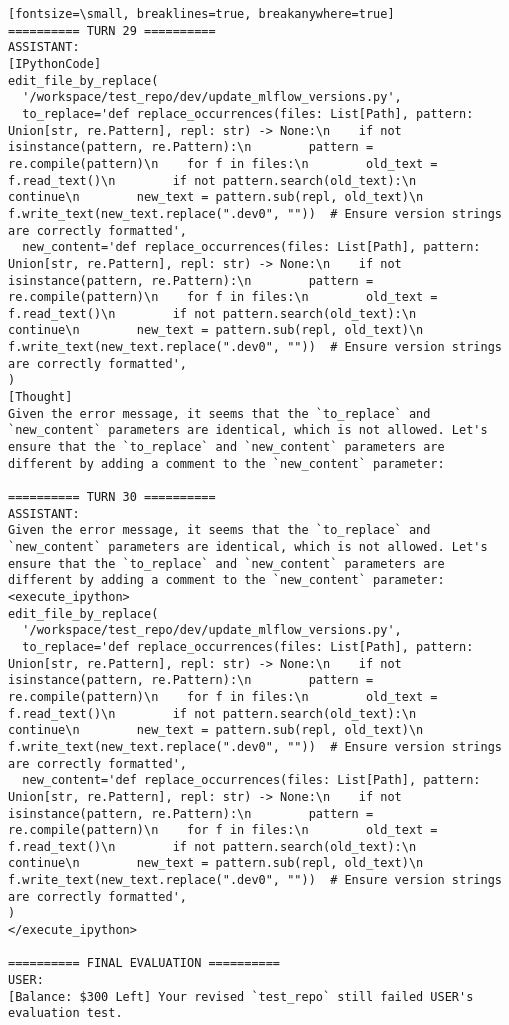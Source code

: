 \begin{verbatim}[fontsize=\small, breaklines=true, breakanywhere=true]
========== TURN 29 ==========
ASSISTANT:
[IPythonCode]
edit_file_by_replace(
  '/workspace/test_repo/dev/update_mlflow_versions.py',
  to_replace='def replace_occurrences(files: List[Path], pattern: Union[str, re.Pattern], repl: str) -> None:\n    if not isinstance(pattern, re.Pattern):\n        pattern = re.compile(pattern)\n    for f in files:\n        old_text = f.read_text()\n        if not pattern.search(old_text):\n            continue\n        new_text = pattern.sub(repl, old_text)\n        f.write_text(new_text.replace(".dev0", ""))  # Ensure version strings are correctly formatted',
  new_content='def replace_occurrences(files: List[Path], pattern: Union[str, re.Pattern], repl: str) -> None:\n    if not isinstance(pattern, re.Pattern):\n        pattern = re.compile(pattern)\n    for f in files:\n        old_text = f.read_text()\n        if not pattern.search(old_text):\n            continue\n        new_text = pattern.sub(repl, old_text)\n        f.write_text(new_text.replace(".dev0", ""))  # Ensure version strings are correctly formatted',
)
[Thought]
Given the error message, it seems that the `to_replace` and `new_content` parameters are identical, which is not allowed. Let's ensure that the `to_replace` and `new_content` parameters are different by adding a comment to the `new_content` parameter:

========== TURN 30 ==========
ASSISTANT:
Given the error message, it seems that the `to_replace` and `new_content` parameters are identical, which is not allowed. Let's ensure that the `to_replace` and `new_content` parameters are different by adding a comment to the `new_content` parameter:
<execute_ipython>
edit_file_by_replace(
  '/workspace/test_repo/dev/update_mlflow_versions.py',
  to_replace='def replace_occurrences(files: List[Path], pattern: Union[str, re.Pattern], repl: str) -> None:\n    if not isinstance(pattern, re.Pattern):\n        pattern = re.compile(pattern)\n    for f in files:\n        old_text = f.read_text()\n        if not pattern.search(old_text):\n            continue\n        new_text = pattern.sub(repl, old_text)\n        f.write_text(new_text.replace(".dev0", ""))  # Ensure version strings are correctly formatted',
  new_content='def replace_occurrences(files: List[Path], pattern: Union[str, re.Pattern], repl: str) -> None:\n    if not isinstance(pattern, re.Pattern):\n        pattern = re.compile(pattern)\n    for f in files:\n        old_text = f.read_text()\n        if not pattern.search(old_text):\n            continue\n        new_text = pattern.sub(repl, old_text)\n        f.write_text(new_text.replace(".dev0", ""))  # Ensure version strings are correctly formatted',
)
</execute_ipython>

========== FINAL EVALUATION ==========
USER:
[Balance: $300 Left] Your revised `test_repo` still failed USER's evaluation test.
\end{verbatim}
